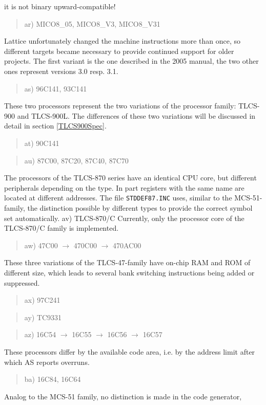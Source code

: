 \documentclass[12pt,twoside]{report}
\newcommand{\tty}[1]{{\tt #1}}
\newcommand{\asname}{{AS}}
\begin{document}
it is not binary upward-compatible!
\begin{quote}
ar) MICO8\_05, MICO8\_V3, MICO8\_V31
\end{quote}
Lattice unfortunately changed the machine instructions more than once, so
different targets became necessary to provide continued support for older
projects.  The first variant is the one described in the 2005 manual, the
two other ones represent versions 3.0 resp. 3.1.
\begin{quote}
as) 96C141, 93C141
\end{quote}
These two processors represent the two variations of the processor
family: TLCS-900 and TLCS-900L.  The differences of these two variations
will be discussed in detail in section \ref{TLCS900Spec}.
\begin{quote}
at) 90C141
\end{quote}
\begin{quote}
au) 87C00, 87C20, 87C40, 87C70
\end{quote}
The processors of the TLCS-870 series have an identical CPU core, but
different peripherals depending on the type.  In part registers with
the same name are located at different addresses.  The file
\tty{STDDEF87.INC} uses, similar to the MCS-51-family, the distinction
possible by different types to provide the correct symbol set
automatically.
av) TLCS-870/C
Currently, only the processor core of the TLCS-870/C family is
implemented.
\begin{quote}
aw) 47C00 $\rightarrow$ 470C00 $\rightarrow$ 470AC00
\end{quote}
These three variations of the TLCS-47-family have on-chip RAM and ROM
of different size, which leads to several bank switching instructions
being added or suppressed.
\begin{quote}
ax) 97C241
\end{quote}
\begin{quote}
ay) TC9331
\end{quote}
\begin{quote}
az) 16C54 $\rightarrow$ 16C55 $\rightarrow$ 16C56 $\rightarrow$ 16C57
\end{quote}
These processors differ by the available code area, i.e. by the address
limit after which \asname{} reports overruns.
\begin{quote}
ba) 16C84, 16C64
\end{quote}
Analog to the MCS-51 family, no distinction is made in the code generator,
\end{document}
